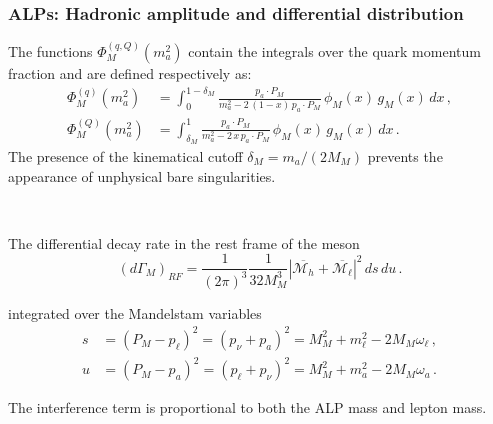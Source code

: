 \documentclass[mathserif, 10pt, dvipsnames]{beamer}
\begin{document}
\begin{frame}\frametitle{ALPs: Hadronic amplitude and differential distribution}The functions $\Phi^{(q,Q)}_M (m_a^2)$ contain the integrals over the quark momentum fraction
    and are defined respectively as:
    \begin{align*}
        \Phi^{(q)}_M (m_a^2) & = \int^{1-\delta_M}_0 \frac{p_a \cdot P_M}{m_a^2-2\,(1-x)\,p_a\cdot P_M} \, \phi_M(x) \,g_M(x)\, dx\,, \\
        \Phi^{(Q)}_M (m_a^2) & = \int^1_{\delta_M} \frac{p_a \cdot P_M}{m_a^2-2\,x\,p_a\cdot P_M}     \, \phi_M(x) \,g_M(x)\, dx \,.
    \end{align*}
    The presence of the kinematical cutoff $\delta_M=m_a/(2 M_M)$ prevents the appearance of unphysical bare singularities.

    ~

    The differential decay rate in the rest frame of the meson
    $$\left(d \Gamma_M \right)_{RF} = \frac{1}{(2 \pi)^3} \frac{1}{32 M_M^3} |\overline{\mathcal{M}_h} + \overline{\mathcal{M}_\ell}  |^2 \,ds \,du \,.$$

    integrated over the Mandelstam variables
    \begin{align*}
        s & = (P_M - p_\ell)^2 = (p_\nu+p_a)^2 = M_M^2 + m_\ell^2- 2 M_M \omega_\ell\,, \\
        u & = (P_M - p_a)^2 = (p_\ell+p_\nu)^2 = M_M^2 + m_a^2- 2 M_M \omega_a\,.
    \end{align*}

    The interference term is proportional to both the ALP mass and lepton mass.

\end{frame}
\end{document}
